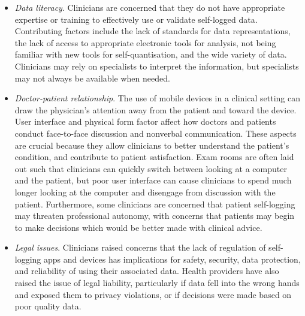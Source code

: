 \documentclass{sigchi}
\begin{document}
\begin{itemize}
    
    \item \textit{Data literacy}. Clinicians are concerned that they do not have appropriate expertise or training to effectively use or validate self-logged data. Contributing factors include the lack of standards for data representations, the lack of access to appropriate electronic tools for analysis, not being familiar with new tools for self-quantisation, and the wide variety of data. Clinicians may rely on specialists to interpret the information, but specialists may not always be available when needed.
    
    \item \textit{Doctor-patient relationship}. The use of mobile devices in a clinical setting can draw the physician's attention away from the patient and toward the device. User interface and physical form factor affect how doctors and patients conduct face-to-face discussion and nonverbal communication. These aspects are crucial because they allow clinicians to better understand the patient's condition, and contribute to patient satisfaction. Exam rooms are often laid out such that clinicians can quickly switch between looking at a computer and the patient, but poor user interface can cause clinicians to spend much longer looking at the computer and disengage from discussion with the patient. Furthermore, some clinicians are concerned that patient self-logging may threaten professional autonomy, with concerns that patients may begin to make decisions which would be better made with clinical advice.

    
    
    \item \textit{Legal issues}. Clinicians raised concerns that the lack of regulation of self-logging apps and devices has implications for safety, security, data protection, and reliability of using their associated data. Health providers have also raised the issue of legal liability, particularly if data fell into the wrong hands and exposed them to privacy violations, or if decisions were made based on poor quality data.
\end{itemize}
\end{document}
